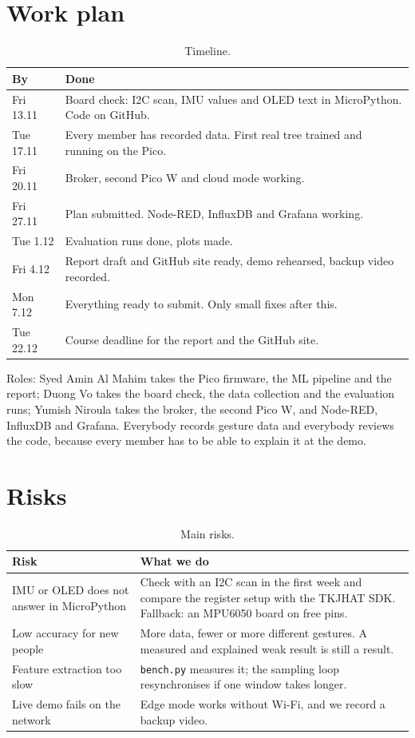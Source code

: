 \documentclass{article}
\begin{document}
\section{Work plan}

\begin{table}[htbp]
\centering
\caption{Timeline.}
\begin{tabularx}{\textwidth}{@{}l L@{}}
\toprule
By & Done \\
\midrule
Fri 13.11 & Board check: I2C scan, IMU values and OLED text in MicroPython. Code on GitHub. \\
Tue 17.11 & Every member has recorded data. First real tree trained and running on the Pico. \\
Fri 20.11 & Broker, second Pico W and cloud mode working. \\
Fri 27.11 & Plan submitted. Node-RED, InfluxDB and Grafana working. \\
Tue 1.12 & Evaluation runs done, plots made. \\
Fri 4.12 & Report draft and GitHub site ready, demo rehearsed, backup video recorded. \\
Mon 7.12 & Everything ready to submit. Only small fixes after this. \\
Tue 22.12 & Course deadline for the report and the GitHub site. \\
\bottomrule
\end{tabularx}
\end{table}

\noindent Roles: Syed Amin Al Mahim takes the Pico firmware, the ML pipeline and the report; Duong Vo takes the board check, the data collection and the evaluation runs; Yumish Niroula takes the broker, the second Pico W, and Node-RED, InfluxDB and Grafana. Everybody records gesture data and everybody reviews the code, because every member has to be able to explain it at the demo.

\section{Risks}

\begin{table}[htbp]
\centering
\caption{Main risks.}
\begin{tabularx}{\textwidth}{@{}p{4.6cm} L@{}}
\toprule
Risk & What we do \\
\midrule
IMU or OLED does not answer in MicroPython & Check with an I2C scan in the first week and compare the register setup with the TKJHAT SDK. Fallback: an MPU6050 board on free pins. \\
Low accuracy for new people & More data, fewer or more different gestures. A measured and explained weak result is still a result. \\
Feature extraction too slow & \texttt{bench.py} measures it; the sampling loop resynchronises if one window takes longer. \\
Live demo fails on the network & Edge mode works without Wi-Fi, and we record a backup video. \\
\bottomrule
\end{tabularx}
\end{table}
\end{document}
